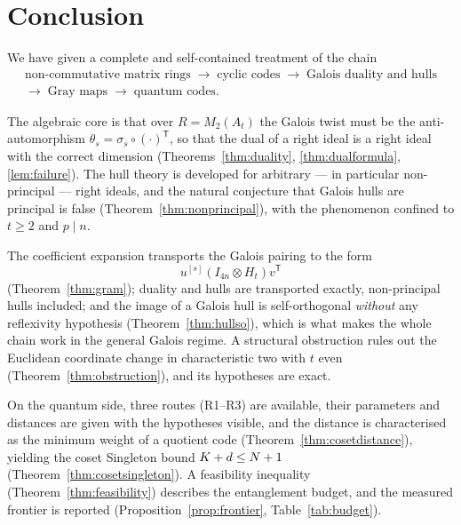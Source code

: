 \section{Conclusion}
\label{sec:conclusion}

We have given a complete and self-contained treatment of the chain
\[
  \begin{gathered}
    \text{non-commutative matrix rings}
    \;\longrightarrow\;
    \text{cyclic codes}
    \;\longrightarrow\;
    \text{Galois duality and hulls}\\[3pt]
    \longrightarrow\;
    \text{Gray maps}
    \;\longrightarrow\;
    \text{quantum codes}.
  \end{gathered}
\]

The algebraic core is that over $R=M_2(A_t)$ the Galois twist must be the
anti-automorphism $\theta_s=\sigma_s\circ(\cdot)^{\mathsf T}$, so that the dual
of a right ideal is a right ideal with the correct dimension
(Theorems~\ref{thm:duality}, \ref{thm:dualformula}, \ref{lem:failure}). The hull
theory is developed for arbitrary --- in particular non-principal --- right
ideals, and the natural conjecture that Galois hulls are principal is false
(Theorem~\ref{thm:nonprincipal}), with the phenomenon confined to $t\ge2$ and
$p\mid n$.

The coefficient expansion transports the Galois pairing to the form
\[
  u^{[s]}(I_{4n}\otimes H_t)v^{\mathsf T}
\]
(Theorem~\ref{thm:gram}); duality and hulls are transported exactly,
non-principal hulls included; and the image of a Galois hull is
self-orthogonal \emph{without} any reflexivity hypothesis
(Theorem~\ref{thm:hullso}), which is what makes the whole chain work in the
general Galois regime. A structural obstruction rules out the Euclidean
coordinate change in characteristic two with $t$ even
(Theorem~\ref{thm:obstruction}), and its hypotheses are exact.

On the quantum side, three routes (R1--R3) are available, their parameters and
distances are given with the hypotheses visible, and the distance is
characterised as the minimum weight of a quotient code
(Theorem~\ref{thm:cosetdistance}), yielding the coset Singleton bound
$K+d\le N+1$ (Theorem~\ref{thm:cosetsingleton}). A feasibility inequality
(Theorem~\ref{thm:feasibility}) describes the entanglement budget, and the
measured frontier is reported (Proposition~\ref{prop:frontier},
Table~\ref{tab:budget}).

